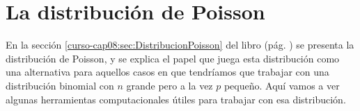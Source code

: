 \documentclass[10pt,a4paper]{article}\usepackage[]{graphicx}\usepackage[]{color}
\newcounter {cont01}
\begin{document}
%
%
%


\section{La distribución de Poisson}
\label{tut08:sec:DistribucionPoisson}

En la sección \ref{curso-cap08:sec:DistribucionPoisson} del libro (pág. \pageref{curso-cap08:sec:DistribucionPoisson}) se presenta la distribución de Poisson, y se explica el papel que juega esta distribución como una alternativa para aquellos casos en que tendríamos que trabajar con una distribución binomial con $n$ grande pero a la vez $p$ pequeño. Aquí vamos a ver algunas herramientas computacionales útiles para trabajar con esa distribución.
\end{document}
